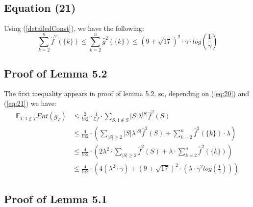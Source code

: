 \documentclass{article}
\begin{document}
		\subsection{Equation (21)}
			Using (\ref{detailedConst}), we have the following:
			\begin{equation} \label{eq:21}
				\sum_{k=2}^n \hat{f}^2 \left( \{k\} \right) 
				\leq \sum_{k=2}^n \hat{g}^2 \left( \{k\} \right) 
				\leq \left( 9 + \sqrt{17} \right) ^ 2 \cdot \gamma \cdot log \left( \frac{1}{\gamma} \right)
			\end{equation}
	
		\subsection{Proof of Lemma 5.2}
			The first inequality appears in proof of lemma 5.2, so, depending on (\ref{eq:20}) and (\ref{eq:21}) we have:
			\begin{equation} \label{lemma5:2}\begin{aligned}
				\mathbb{E}_{T, 1 \notin T} Ent(g_T)
				& \leq \frac{2}{ln2} \cdot \frac{1}{\mathbb{E} f} \cdot \sum_{S, 1 \notin S} |S| \lambda^{|S|} \hat{f}^2(S) \\
				& \leq \frac{4}{ln2} \cdot \left( \sum_{|S| \geq 2} |S| \lambda^{|S|} \hat{f}^2(S) + \sum_{k=2}^n \hat{f}^2 \left( \{k\} \right) \cdot \lambda \right) \\
				& \leq \frac{4}{ln2}  \cdot \left( 2 \lambda^2 \cdot \sum_{|S| \geq 2} \hat{f}^2(S) + \lambda \cdot \sum_{k=2}^n \hat{f}^2 \left( \{k\} \right) \right) \\
				& \leq \frac{4}{ln2} \cdot \left( 4 ( \lambda^2 \cdot \gamma ) + \left( 9 + \sqrt{17} \right)^2 \cdot \left( \lambda \cdot \gamma^2 log \left( \frac{1}{\gamma} \right) \right) \right)
			\end{aligned}
			\end{equation}
		
		\subsection{Proof of Lemma 5.1}
			
\end{document}
